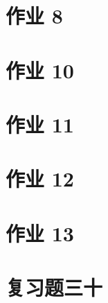 \documentclass[\ROOT/main.tex]{subfiles}
\begin{document}
\section{作业 8}

\section{作业 10}

\section{作业 11}

\section{作业 12}

\section{作业 13}

\section{复习题三十}

\end{document}
